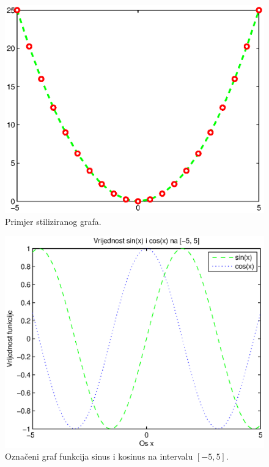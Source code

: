 \documentclass[a4paper, 10pt]{article}
\begin{document}
\begin{figure}[!htb]
\centering
\includegraphics[width=0.95\linewidth]{slike/plot_stil.eps}
\caption{Primjer stiliziranog grafa.}
\label{fig:plot_stil}
\end{figure}

\begin{figure}[!htb]
\centering
\includegraphics[width=0.95\linewidth]{slike/plot_sin_cos_oznaceno.eps}
\caption{Označeni graf funkcija sinus i kosinus na intervalu $[-5, 5]$.}
\label{fig:plot_sin_cos_oznaceno}
\end{figure}
\end{document}

